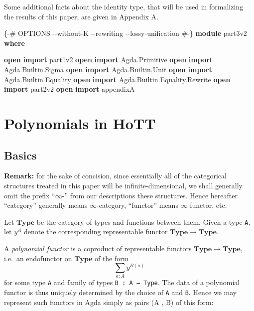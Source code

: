\documentclass[
  11pt,
  oneside,
  article]{memoir}
\newenvironment{Shaded}{}{}
\newcommand{\KeywordTok}[1]{\textcolor[rgb]{0.00,0.44,0.13}{\textbf{#1}}}
\newcommand{\NormalTok}[1]{#1}
\newcommand{\OtherTok}[1]{\textcolor[rgb]{0.00,0.44,0.13}{#1}}
\newcommand{\PreprocessorTok}[1]{\textcolor[rgb]{0.74,0.48,0.00}{#1}}
\theoremstyle{definition}
\theoremstyle{plain}
\newcommand{\0}{\textsf{0}}
\newcommand{\1}{\tn{\textsf{1}}}
\begin{document}
Some additional facts about the identity type, that will be used in
formalizing the results of this paper, are given in Appendix A.

\begin{Shaded}
\begin{Highlighting}[]
\PreprocessorTok{\{{-}\# OPTIONS {-}{-}without{-}K {-}{-}rewriting {-}{-}lossy{-}unification \#{-}\}}
\KeywordTok{module}\NormalTok{ part3v2 }\KeywordTok{where}

\KeywordTok{open} \KeywordTok{import}\NormalTok{ part1v2}
\KeywordTok{open} \KeywordTok{import}\NormalTok{ Agda}\OtherTok{.}\NormalTok{Primitive}
\KeywordTok{open} \KeywordTok{import}\NormalTok{ Agda}\OtherTok{.}\NormalTok{Builtin}\OtherTok{.}\NormalTok{Sigma}
\KeywordTok{open} \KeywordTok{import}\NormalTok{ Agda}\OtherTok{.}\NormalTok{Builtin}\OtherTok{.}\NormalTok{Unit}
\KeywordTok{open} \KeywordTok{import}\NormalTok{ Agda}\OtherTok{.}\NormalTok{Builtin}\OtherTok{.}\NormalTok{Equality}
\KeywordTok{open} \KeywordTok{import}\NormalTok{ Agda}\OtherTok{.}\NormalTok{Builtin}\OtherTok{.}\NormalTok{Equality}\OtherTok{.}\NormalTok{Rewrite}
\KeywordTok{open} \KeywordTok{import}\NormalTok{ part2v2}
\KeywordTok{open} \KeywordTok{import}\NormalTok{ appendixA}
\end{Highlighting}
\end{Shaded}

\chapter{Polynomials in HoTT}\label{polynomials-in-hott}

\section{Basics}\label{basics}

\textbf{Remark:} for the sake of concision, since essentially all of the
categorical structures treated in this paper will be
infinite-dimensional, we shall generally omit the prefix ``\(\infty\)-''
from our descriptions these structures. Hence hereafter ``category''
generally means \(\infty\)-category, ``functor'' means
\(\infty\)-functor, etc.

Let \(\mathbf{Type}\) be the category of types and functions between
them. Given a type \texttt{A}, let \(y^A\) denote the corresponding
representable functor \(\mathbf{Type} \to \mathbf{Type}\).

A \emph{polynomial functor} is a coproduct of representable functors
\(\mathbf{Type} \to \mathbf{Type}\), i.e.~an endofunctor on
\(\mathbf{Type}\) of the form \[
\sum_{a : A} y^{B(a)}
\] for some type \texttt{A} and family of types
\texttt{B\ :\ A\ →\ Type}. The data of a polynomial functor is thus
uniquely determined by the choice of \texttt{A} and \texttt{B}. Hence we
may represent such functors in Agda simply as pairs (A , B) of this
form:
\end{document}
